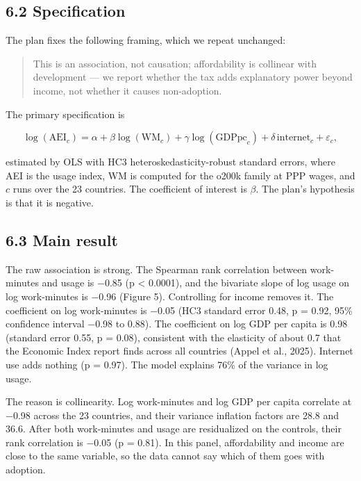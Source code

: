 \documentclass[11pt]{article}
\begin{document}
\subsection{6.2 Specification}

The plan fixes the following framing, which we repeat unchanged:

\begin{quote}
This is an association, not causation; affordability is collinear with development --- we report whether the tax adds explanatory power beyond income, not whether it causes non-adoption.
\end{quote}

The primary specification is

\[\log(\mathrm{AEI}_c) = \alpha + \beta \log(\mathrm{WM}_c) + \gamma \log(\mathrm{GDPpc}_c) + \delta\,\mathrm{internet}_c + \varepsilon_c,\]

estimated by OLS with HC3 heteroskedasticity-robust standard errors, where AEI is the usage index, WM is computed for the o200k family at PPP wages, and \(c\) runs over the 23 countries. The coefficient of interest is \(\beta\). The plan's hypothesis is that it is negative.

\subsection{6.3 Main result}

The raw association is strong. The Spearman rank correlation between work-minutes and usage is −0.85 (p \textless{} 0.0001), and the bivariate slope of log usage on log work-minutes is −0.96 (Figure 5). Controlling for income removes it. The coefficient on log work-minutes is −0.05 (HC3 standard error 0.48, p = 0.92, 95\% confidence interval −0.98 to 0.88). The coefficient on log GDP per capita is 0.98 (standard error 0.55, p = 0.08), consistent with the elasticity of about 0.7 that the Economic Index report finds across all countries (Appel et al., 2025). Internet use adds nothing (p = 0.97). The model explains 76\% of the variance in log usage.

The reason is collinearity. Log work-minutes and log GDP per capita correlate at −0.98 across the 23 countries, and their variance inflation factors are 28.8 and 36.6. After both work-minutes and usage are residualized on the controls, their rank correlation is −0.05 (p = 0.81). In this panel, affordability and income are close to the same variable, so the data cannot say which of them goes with adoption.
\end{document}
